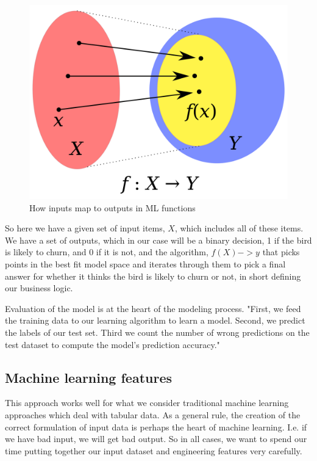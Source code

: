 \documentclass[draft, 11pt]{diazessay} %
\begin{document}
\begin{figure}[!ht]
  \includegraphics[width=\linewidth]{figures/function.png}
  \caption{How inputs map to outputs in ML functions \citep{klein2013coding}}
\end{figure}

So here we have a given set of input items, $X$,  which includes all of these items. We have a set of outputs, which in our case will be a binary decision, 1 if the bird is likely to churn, and 0 if it is not, and the algorithm, $f(X) -> y$ that picks points in the best fit model space and iterates through them to pick a final answer for whether it thinks the bird is likely to churn or not, in short defining our business logic. 

Evaluation of the model is at the heart of the modeling process. "First, we feed the training data  to our learning algorithm to learn a model. Second, we predict the labels of our test set. Third we count the number of wrong predictions on the test dataset to compute the model’s prediction  accuracy."\citep{raschka2018model}

\subsection{Machine learning features}
This approach works well for what we consider traditional machine learning approaches which deal with tabular data.  As a general rule, the creation of the correct formulation of input data is perhaps the heart of machine learning. I.e. if we have bad input, we will get bad output. So in all cases, we want to spend our time putting together our input dataset and engineering features very carefully. 
\end{document}
